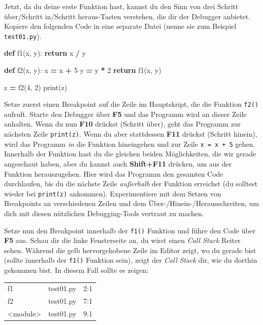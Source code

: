 \documentclass[
]{book}
\newenvironment{Shaded}{\begin{snugshade}}{\end{snugshade}}
\newcommand{\BuiltInTok}[1]{#1}
\newcommand{\ControlFlowTok}[1]{\textcolor[rgb]{0.13,0.29,0.53}{\textbf{#1}}}
\newcommand{\DecValTok}[1]{\textcolor[rgb]{0.00,0.00,0.81}{#1}}
\newcommand{\KeywordTok}[1]{\textcolor[rgb]{0.13,0.29,0.53}{\textbf{#1}}}
\newcommand{\NormalTok}[1]{#1}
\newcommand{\OperatorTok}[1]{\textcolor[rgb]{0.81,0.36,0.00}{\textbf{#1}}}
\begin{document}
Jetzt, da du deine erste Funktion hast, kannst du den Sinn von drei Schritt über/Schritt in/Schritt heraus-Tasten verstehen, die dir der Debugger anbietet. Kopiere den folgenden Code in eine separate Datei (nenne sie zum Beispiel \texttt{test01.py}).

\begin{Shaded}
\begin{Highlighting}[]
\KeywordTok{def}\NormalTok{ f1(x, y):}
  \ControlFlowTok{return}\NormalTok{ x }\OperatorTok{/}\NormalTok{ y}
  
\KeywordTok{def}\NormalTok{ f2(x, y):}
\NormalTok{  x }\OperatorTok{=}\NormalTok{ x }\OperatorTok{+} \DecValTok{5}
\NormalTok{  y }\OperatorTok{=}\NormalTok{ y }\OperatorTok{*} \DecValTok{2}
  \ControlFlowTok{return}\NormalTok{ f1(x, y)}
  
\NormalTok{z }\OperatorTok{=}\NormalTok{ f2(}\DecValTok{4}\NormalTok{, }\DecValTok{2}\NormalTok{)}
\BuiltInTok{print}\NormalTok{(z)}
\end{Highlighting}
\end{Shaded}

Setze zuerst einen Breakpoint auf die Zeile im Hauptskript, die die Funktion \texttt{f2()} aufruft. Starte den Debugger über \textbf{F5} und das Programm wird an dieser Zeile anhalten. Wenn du nun \textbf{F10} drückst (Schritt über), geht das Programm zur nächsten Zeile \texttt{print(z)}. Wenn du aber stattdessen \textbf{F11} drückst (Schritt hinein), wird das Programm \emph{in} die Funktion hineingehen und zur Zeile \texttt{x\ =\ x\ +\ 5} gehen. Innerhalb der Funktion hast du die gleichen beiden Möglichkeiten, die wir gerade angeschaut haben, aber du kannst auch \textbf{Shift+F11} drücken, um aus der Funktion herauszugehen. Hier wird das Programm den gesamten Code durchlaufen, bis du die nächste Zeile \emph{außerhalb} der Funktion erreichst (du solltest wieder bei \texttt{print(z)} ankommen). Experimentiere mit dem Setzen von Breakpoints an verschiedenen Zeilen und dem Über-/Hinein-/Herausschreiten, um dich mit diesen nützlichen Debugging-Tools vertraut zu machen.

Setze nun den Breakpoint innerhalb der \texttt{f1()} Funktion und führe den Code über \textbf{F5} aus. Schau dir die linke Fensterseite an, du wirst einen \emph{Call Stack} Reiter sehen. Während die gelb hervorgehobene Zeile im Editor zeigt, wo du gerade bist (sollte innerhalb der \texttt{f1()} Funktion sein), zeigt der \emph{Call Stack} dir, wie du dorthin gekommen bist. In diesem Fall sollte es zeigen:

\begin{longtable}[]{@{}lll@{}}
\toprule\noalign{}
\endhead
\bottomrule\noalign{}
\endlastfoot
f1 & test01.py & 2:1 \\
f2 & test01.py & 7:1 \\
\textless module\textgreater{} & test01.py & 9:1 \\
\end{longtable}
\end{document}
